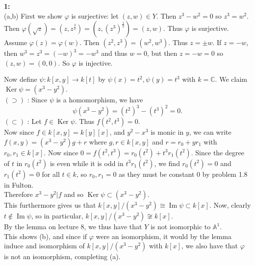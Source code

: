 \documentclass[a4paper]{article}
\DeclareMathOperator{\Ima}{Im}
\DeclareMathOperator{\Ker}{Ker}
\begin{document}
    \textbf{1:}\\
    (a,b) First we show $\varphi$ is surjective: let $(z,w) \in Y$. Then
    $z^3 - w^2 = 0$ so $z^3 = w^2$. Then
    $ \varphi (\sqrt{z}) = \left( z, z^{\frac{3}{2}} \right) =
    \left( z, \left( z^3 \right)^{\frac{1}{2}} \right) = \left( z,
    w \right)  $. Thus $\varphi$ is surjective.\\
    \linebreak
    Assume $\varphi(z) = \varphi(w)$. Then
    $\left( z^2 , z^3 \right) = \left( w^2, w^3 \right) $. Thus
    $z = \pm w$. If $z = -w$, then $w^3 = z^3 = (-w)^3 = -w^3$ and thus $w
    = 0$, but then $z = -w = 0$ so $(z,w) = (0,0)$. So  $\varphi$ is
    injective.\\
    \linebreak





    Now define 
    $\psi  \colon k [x,y] \to k[t]$ by $\psi(x) = t^2, \psi (y) = t^3$ with $k
    = \mathbb{C}$. We claim $\Ker \psi = \left( x^3 - y^2 \right)$.\\
    $(\supset )$ : Since $\psi$ is a homomorphism, we have
    \[
    \psi (x^3 - y^2) = \left( t^2 \right)^{3} - \left( t^3 \right)^2
    = 0.
    \] 
    $\left( \subset  \right) $ : Let $f \in \Ker \psi$. Thus $f(t^2, t^3)
    = 0$.\\
    Now since $f \in k\left[ x,y \right] = k\left[ y \right] [x] $, and $y^2
    - x^3$ is monic in $y$, we can write
    $f(x,y) = (x^3 - y^2) g + r$ where $g,r \in k\left[ x,y \right] $ 
    and $r = r_0 + y r_1$ with $r_0, r_1 \in k\left[ x \right] $. Now
    since  $0 = f(t^2 , t^3) = r_0 (t^2) + t^3 r_1(t^2)$.
    Since the degree of $t$ in $r_0(t^2)$ is even while it is odd in
    $t^3 r_1(t^2)$, we find $r_0 (t^2) = 0$ and $r_1 (t^2) = 0$ for all
    $t \in k$, so $r_0, r_1 = 0$ as they must be constant $0$ by problem 1.8 in
    Fulton.\\
    Therefore $x^3 - y^2 | f$ and so $\Ker \psi \subset \left( x^3 - y^2
    \right) $.\\
    \linebreak
    This furthermore gives us that
    $k\left[ x,y \right] / \left( x^3 - y^2 \right) \cong \Ima \psi \subset
    k\left[ x \right]  $. Now, 
    clearly $t \not\in \Ima \psi$, so in particular,
    $k\left[ x,y \right] / (x^3 - y^2) \not \cong k\left[ x \right] $.\\
    By the lemma on lecture $8$, we thus have
    that $Y$ is not isomorphic to $\mathbb{A}^{1}$.\\ 
    This shows (b), and since if $\varphi$ were an isomorphism, it
    would by the lemma induce and isomorphism of 
    $k\left[ x,y \right] / (x^3-y^2)$ with $k\left[ x \right] $, we 
    also have that $\varphi$ is not an isomorphism, completing (a).\\
    \linebreak
    
\end{document}
